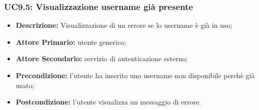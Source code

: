 \subsubsection{UC9.5: Visualizzazione username già presente}
\label{sec:UC9.5}
\begin{itemize}
    \item \textbf{Descrizione:} Visualizzazione di un errore se lo username è già in uso;
    \item \textbf{Attore Primario:} utente generico;
    \item \textbf{Attore Secondario:} servizio di autenticazione esterno;
    \item \textbf{Precondizione:} l'utente ha inserito uno username non disponibile perchè già usato;
    \item \textbf{Postcondizione:} l'utente visualizza un messaggio di errore.
\end{itemize}